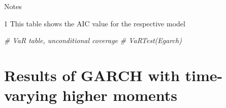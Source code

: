 \documentclass[a4paper, twoside]{templates/ociamthesis}
\newenvironment{Shaded}{\begin{snugshade}}{\end{snugshade}}
\newcommand{\CommentTok}[1]{\textcolor[rgb]{0.56,0.35,0.01}{\textit{#1}}}
\renewenvironment{Shaded}
{
  \vspace{10pt}%
  \begin{snugshade}%
}{%
  \end{snugshade}%
  \vspace{8pt}%
}
\begin{document}
\begin{table}[h!]

\caption{\label{tab:aicTable}Model selection according to AIC}
\centering
\begin{threeparttable}
\begin{tablenotes}
\item Notes
\item[1] This table shows the AIC value for the respective model
\end{tablenotes}
\end{threeparttable}
\end{table}

\begin{Shaded}
\begin{Highlighting}[]
\CommentTok{\# VaR table, unconditional coverage}
\CommentTok{\# VaRTest(Egarch)}
\end{Highlighting}
\end{Shaded}

\hypertarget{results-of-garch-with-time-varying-higher-moments}{%
\section{Results of GARCH with time-varying higher moments}\label{results-of-garch-with-time-varying-higher-moments}}
\end{document}
